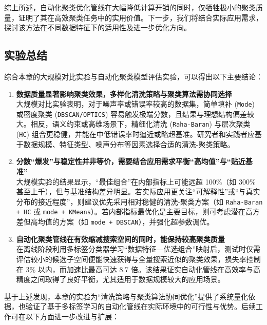 \documentclass[10pt]{article} %
\numberwithin{equation}{section}
\begin{document}
\noindent
综上所述，自动化聚类优化管线在大幅降低计算开销的同时，仅牺牲极小的聚类质量，证明了其在高效聚类任务中的实用价值。下一步，我们将结合实际应用需求，探讨该方法在不同数据特征下的适用性及进一步优化方向。


\subsection{实验总结}
\label{sec:exp_summary}

综合本章的大规模对比实验与自动化聚类模型评估实验，可以得出以下主要结论：

\begin{enumerate}
    \item \textbf{数据质量显著影响聚类效果，多样化清洗策略与聚类算法需协同选择} \\
    大规模对比实验表明，对于噪声率或错误率较高的数据集，简单填补 (\texttt{Mode}) 或密度聚类 (\texttt{DBSCAN/OPTICS}) 容易触发极端分数，且结果与理想结构偏差较大。相反，语义约束或高维场景下，精细化清洗 (\texttt{Raha-Baran}) 与层次聚类 (\texttt{HC}) 组合更稳健，并能在中低错误率时逼近或略超基准。研究者和实践者应基于数据规模、特征类型、噪声分布等因素选择合适的清洗-聚类策略。

    \item \textbf{分数“爆发”与稳定性并非等价，需要结合应用需求平衡“高均值”与“贴近基准”} \\
    大规模实验的结果显示，“最佳组合”在内部指标上可能远超 100\%（如 300\% 甚至上千），但与基准结构差异明显。若实际应用更关注“可解释性”或“与真实分布的接近程度”，则建议优先采用相对稳健的清洗-聚类方案（如 \texttt{Raha-Baran + HC} 或 \texttt{mode + KMeans}）。若内部指标最优化是主要目标，则可考虑潜在高方差但高均值的方案（如 \texttt{mode + DBSCAN}），并强化超参数调优。

    \item \textbf{自动化聚类管线在有效缩减搜索空间的同时，能保持较高聚类质量} \\
    在离线阶段利用多标签分类器学习“数据特征—优选组合”映射后，测试时仅需评估较小的候选子空间便能快速获得与全量搜索近似的聚类效果，损失率控制在 3\% 以内，而加速比最高可达 8.7 倍。该结果证实自动化管线在高效率与高精度之间取得了良好平衡，尤其适用于数据规模较大的应用场景。

\end{enumerate}

基于上述发现，本章的实验为“清洗策略与聚类算法协同优化”提供了系统量化依据，也验证了基于多标签学习的自动化管线在实际环境中的可行性与优势。后续工作可在以下方面进一步改进与扩展：
\end{document}
